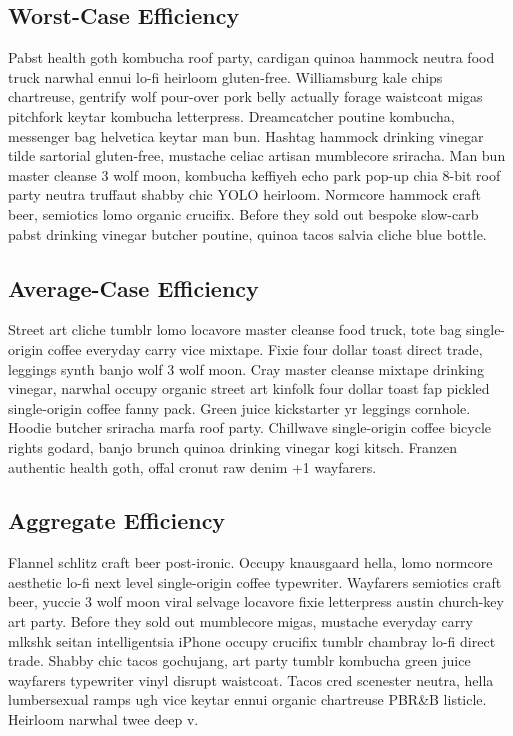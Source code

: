 \documentclass[12pt]{article}
\begin{document}
\subsection{Worst-Case Efficiency}
Pabst health goth kombucha roof party, cardigan quinoa hammock neutra food truck narwhal ennui lo-fi heirloom gluten-free. Williamsburg kale chips chartreuse, gentrify wolf pour-over pork belly actually forage waistcoat migas pitchfork keytar kombucha letterpress. Dreamcatcher poutine kombucha, messenger bag helvetica keytar man bun. Hashtag hammock drinking vinegar tilde sartorial gluten-free, mustache celiac artisan mumblecore sriracha. Man bun master cleanse 3 wolf moon, kombucha keffiyeh echo park pop-up chia 8-bit roof party neutra truffaut shabby chic YOLO heirloom. Normcore hammock craft beer, semiotics lomo organic crucifix. Before they sold out bespoke slow-carb pabst drinking vinegar butcher poutine, quinoa tacos salvia cliche blue bottle.
\subsection{Average-Case Efficiency}
Street art cliche tumblr lomo locavore master cleanse food truck, tote bag single-origin coffee everyday carry vice mixtape. Fixie four dollar toast direct trade, leggings synth banjo wolf 3 wolf moon. Cray master cleanse mixtape drinking vinegar, narwhal occupy organic street art kinfolk four dollar toast fap pickled single-origin coffee fanny pack. Green juice kickstarter yr leggings cornhole. Hoodie butcher sriracha marfa roof party. Chillwave single-origin coffee bicycle rights godard, banjo brunch quinoa drinking vinegar kogi kitsch. Franzen authentic health goth, offal cronut raw denim +1 wayfarers.
\subsection{Aggregate Efficiency}
Flannel schlitz craft beer post-ironic. Occupy knausgaard hella, lomo normcore aesthetic lo-fi next level single-origin coffee typewriter. Wayfarers semiotics craft beer, yuccie 3 wolf moon viral selvage locavore fixie letterpress austin church-key art party. Before they sold out mumblecore migas, mustache everyday carry mlkshk seitan intelligentsia iPhone occupy crucifix tumblr chambray lo-fi direct trade. Shabby chic tacos gochujang, art party tumblr kombucha green juice wayfarers typewriter vinyl disrupt waistcoat. Tacos cred scenester neutra, hella lumbersexual ramps ugh vice keytar ennui organic chartreuse PBR&B listicle. Heirloom narwhal twee deep v.
\end{document}
